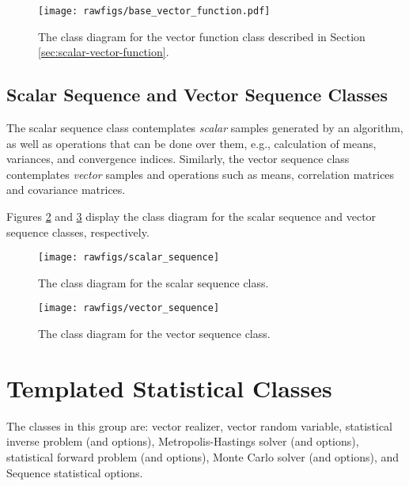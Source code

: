 \begin{figure}[htpb]
\centering
\hspace{-40pt}
\texttt{[image: rawfigs/base\_vector\_function.pdf]}
\vspace{-1.2cm}
\caption{The class diagram for the vector function class described in Section \ref{sec:scalar-vector-function}.} %
\label{fig-vector-function-class}
\end{figure}


\subsection{Scalar Sequence and Vector Sequence Classes}\label{sec:scalar-vector-sequence}
%
The scalar sequence class contemplates {\it scalar} samples generated by an algorithm, as well as operations that can
be done over them, e.g., calculation of means, variances, and convergence indices.
Similarly, the vector sequence class contemplates {\it vector} samples and operations such as means, correlation matrices and covariance matrices.

Figures \ref{fig-scalar-sequence-class} and \ref{fig-vector-sequence-class} display the class diagram for the scalar sequence  and vector sequence classes, respectively.

\begin{figure}[htpb]
\centering
\texttt{[image: rawfigs/scalar\_sequence]}
\vspace{-1.cm}
\caption{The class diagram for the scalar sequence class.}
\label{fig-scalar-sequence-class}
\end{figure}

\begin{figure}[htpb]
\centering
\texttt{[image: rawfigs/vector\_sequence]}
\vspace{-1.cm}
\caption{The class diagram for the vector sequence class.}
\label{fig-vector-sequence-class}
\end{figure}



\section{Templated Statistical Classes}

The classes in this group are: vector realizer, vector random variable, statistical inverse problem (and options), Metropolis-Hastings solver (and options), statistical forward problem (and options), Monte Carlo solver (and options), and Sequence statistical options.

